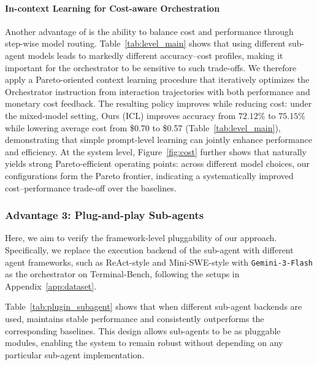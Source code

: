 \paragraph{In-context Learning for Cost-aware Orchestration}
Another advantage of \our{} is the ability to balance cost and performance through step-wise model routing.
Table~\ref{tab:level_main} shows that using different sub-agent models leads to markedly different accuracy--cost profiles, making it important for the orchestrator to be sensitive to such trade-offs.
We therefore apply a Pareto-oriented context learning procedure that iteratively optimizes the Orchestrator instruction from interaction trajectories with both performance and monetary cost feedback.
The resulting policy improves \our while reducing cost: under the mixed-model setting, Ours (ICL) improves accuracy from $72.12\%$ to $75.15\%$ while lowering average cost from \$0.70 to \$0.57 (Table~\ref{tab:level_main}), demonstrating that simple prompt-level learning can jointly enhance performance and efficiency.
At the system level, Figure~\ref{fig:cost} further shows that \our naturally yields strong Pareto-efficient operating points: across different model choices, our configurations form the Pareto frontier, indicating a systematically improved cost--performance trade-off over the baselines.


\subsubsection{Advantage 3: Plug-and-play Sub-agents}
\label{sec:adv3}
Here, we aim to verify the framework-level pluggability of our approach. 
Specifically, we replace the execution backend of the sub-agent with different agent frameworks, such as ReAct-style and Mini-SWE-style with \texttt{Gemini-3-Flash} as the orchestrator on Terminal-Bench, following the setups in Appendix~\ref{app:dataset}.

Table~\ref{tab:plugin_subagent} shows that when different sub-agent backends are used, \our maintains stable performance and consistently outperforms the corresponding baselines. 
This design allows sub-agents to be as pluggable modules, enabling the system to remain robust without depending on any particular sub-agent implementation.

